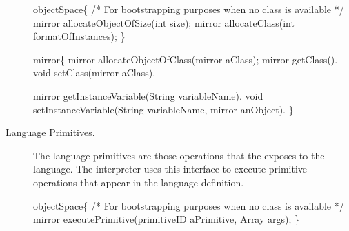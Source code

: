 \begin{description}
\begin{code}
objectSpace\{
    /* For bootstrapping purposes when no class is available */
    mirror allocateObjectOfSize(int size);
    mirror allocateClass(int formatOfInstances);
\}

mirror\{
    mirror allocateObjectOfClass(mirror aClass);
    mirror getClass().
    void setClass(mirror aClass).

    mirror getInstanceVariable(String variableName).
    void setInstanceVariable(String variableName, mirror anObject).
\}
\end{code}

\item[Language Primitives.] The language primitives are those operations that the \VM exposes to the language. The interpreter uses this interface to execute primitive operations that appear in the language definition.

\begin{code}
objectSpace\{
    /* For bootstrapping purposes when no class is available */
    mirror executePrimitive(primitiveID aPrimitive, Array args); 
\}
\end{code}

\end{description}


